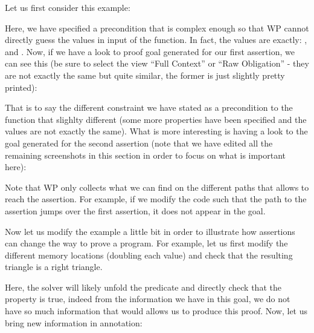Let us first consider this example:






Here, we have specified a precondition that is complex enough so that WP cannot
directly guess the values in input of the function. In fact, the values are
exactly: ,  and .
Now, if we have a look to proof goal generated for our first assertion, we can
see this (be sure to select the view ``Full Context'' or ``Raw Obligation'' -
they are not exactly the same but quite similar, the former is just slightly
pretty printed):




That is to say the different constraint we have stated as a precondition to the
function that slighlty different (some more properties have been specified and
the values are not exactly the same). What is more interesting is having a look
to the goal generated for the second assertion (note that we have edited all the
remaining screenshots in this section in order to focus on what is important
here):





Note that WP only collects what we can find on the different paths that allows
to reach the assertion. For example, if we modify the code such that the path
to the assertion jumps over the first assertion, it does not appear in the goal.







Now let us modify the example a little bit in order to illustrate how assertions
can change the way to prove a program. For example, let us first modify the
different memory locations (doubling each value) and check that the resulting
triangle is a right triangle.








Here, the solver will likely unfold the predicate and directly check that the
property is true, indeed from the information we have in this goal, we do not
have so much information that would allows us to produce this proof. Now, let
us bring new information in annotation:



